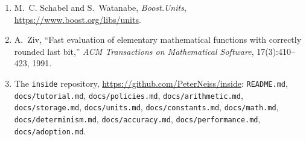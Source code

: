 \documentclass[11pt,a4paper]{article}
\newcommand{\code}[1]{\texttt{\small #1}}
\newcommand{\file}[1]{\texttt{\small #1}}
\begin{document}
\begin{enumerate}[leftmargin=1.8em]
      2024--2026.
\item M.~C. Schabel and S.~Watanabe, \emph{Boost.Units},
      \url{https://www.boost.org/libs/units}.
\item A.~Ziv, ``Fast evaluation of elementary mathematical functions with
      correctly rounded last bit,'' \emph{ACM Transactions on Mathematical
      Software}, 17(3):410--423, 1991.
\item \begin{sloppypar}The \code{inside} repository,
      \url{https://github.com/PeterNeiss/inside}: \file{README.md},
      \file{docs/tutorial.md}, \file{docs/policies.md},
      \file{docs/arithmetic.md}, \file{docs/storage.md}, \file{docs/units.md},
      \file{docs/constants.md}, \file{docs/math.md}, \file{docs/determinism.md}, \file{docs/accuracy.md},
      \file{docs/performance.md}, \file{docs/adoption.md}.\end{sloppypar}
\end{enumerate}
\end{document}
